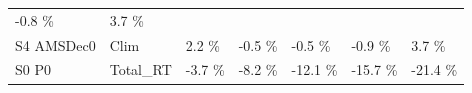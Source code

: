 \documentclass[]{article}
\begin{document}
\begin{longtable}[]{@{}lllllll@{}}
\begin{minipage}[t]{0.11\columnwidth}
-0.8 \%\strut
\end{minipage} & \begin{minipage}[t]{0.11\columnwidth}\raggedright\strut
3.7 \%\strut
\end{minipage}\tabularnewline
\begin{minipage}[t]{0.14\columnwidth}\raggedright\strut
S4 AMSDec0\strut
\end{minipage} & \begin{minipage}[t]{0.13\columnwidth}\raggedright\strut
Clim\strut
\end{minipage} & \begin{minipage}[t]{0.11\columnwidth}\raggedright\strut
2.2 \%\strut
\end{minipage} & \begin{minipage}[t]{0.11\columnwidth}\raggedright\strut
-0.5 \%\strut
\end{minipage} & \begin{minipage}[t]{0.11\columnwidth}\raggedright\strut
-0.5 \%\strut
\end{minipage} & \begin{minipage}[t]{0.11\columnwidth}\raggedright\strut
-0.9 \%\strut
\end{minipage} & \begin{minipage}[t]{0.11\columnwidth}\raggedright\strut
3.7 \%\strut
\end{minipage}\tabularnewline
\begin{minipage}[t]{0.14\columnwidth}\raggedright\strut
S0 P0\strut
\end{minipage} & \begin{minipage}[t]{0.13\columnwidth}\raggedright\strut
Total\_RT\strut
\end{minipage} & \begin{minipage}[t]{0.11\columnwidth}\raggedright\strut
-3.7 \%\strut
\end{minipage} & \begin{minipage}[t]{0.11\columnwidth}\raggedright\strut
-8.2 \%\strut
\end{minipage} & \begin{minipage}[t]{0.11\columnwidth}\raggedright\strut
-12.1 \%\strut
\end{minipage} & \begin{minipage}[t]{0.11\columnwidth}\raggedright\strut
-15.7 \%\strut
\end{minipage} & \begin{minipage}[t]{0.11\columnwidth}\raggedright\strut
-21.4 \%\strut
\end{minipage}\tabularnewline

\end{longtable}
\end{document}
